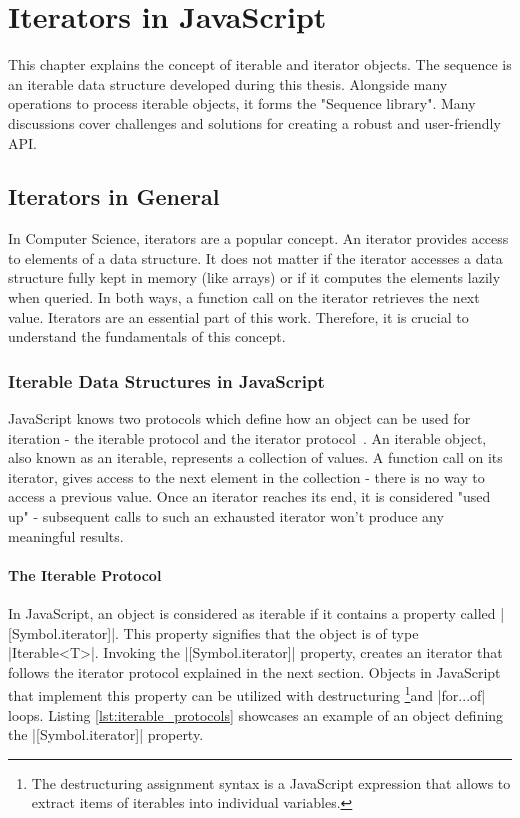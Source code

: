 \chapter{Iterators in JavaScript} %
\label{chap:Iterators in JavaScript}
This chapter explains the concept of iterable and iterator objects. The
sequence is an iterable data structure developed during this thesis. Alongside
many operations to process iterable objects, it forms the "Sequence library".
Many discussions cover challenges and solutions for creating a robust and
user-friendly API.

\section{Iterators in General}
\label{sec:Iterables in General}
In Computer Science, iterators are a popular concept. An iterator provides
access to elements of a data structure. It does not matter if the iterator
accesses a data structure fully kept in memory (like arrays) or if it computes
the elements lazily when queried. In both ways, a function call on the iterator
retrieves the next value. Iterators are an essential part of this work.
Therefore, it is crucial to understand the fundamentals of this concept.

\subsection{Iterable Data Structures in JavaScript}
\label{sub:Iterable data structures in JS}
JavaScript knows two protocols which define how an object can be used for
iteration - the iterable protocol and the iterator
protocol~\cite{mdn_protocols}. An iterable object, also known as an iterable,
represents a collection of values. A function call on its iterator, gives
access to the next element in the collection - there is no way to access a
previous value. Once an iterator reaches its end, it is considered "used up" -
subsequent calls to such an exhausted iterator won't produce any meaningful
results.

\subsubsection{The Iterable Protocol}
\label{subsub:The Iterable Protocol}
In JavaScript, an object is considered as iterable if it contains a property
called |[Symbol.iterator]|. This property signifies that the object is of type
|Iterable<T>|. Invoking the |[Symbol.iterator]| property, creates an
iterator that follows the iterator protocol explained in the next section.
Objects in JavaScript that implement this property can be utilized with
destructuring \footnote{The destructuring assignment syntax is a JavaScript
expression that allows to extract items of iterables into individual
variables.}and |for...of| loops. Listing \ref{lst:iterable_protocols}
showcases an example of an object defining the |[Symbol.iterator]| property.


